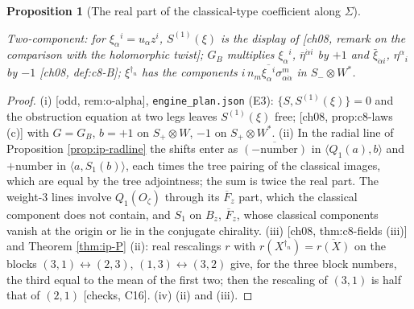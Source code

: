\documentclass[11pt]{report}
\theoremstyle{plain}
\newtheorem{proposition}[theorem]{Proposition}
\theoremstyle{definition}
\numberwithin{equation}{chapter}
\begin{document}
\begin{proposition}[The real part of the classical-type coefficient along $\Sigma$]
\begin{itemize}
\end{itemize}
Two-component: for $\xi_\alpha{}^i=u_\alpha z^i$, $S^{(1)}(\xi)$ is the display of [ch08, remark on the comparison with the holomorphic twist]; $G_B$ multiplies $\xi_\alpha{}^i$, $\bar\eta^{\dot\alpha i}$ by $+1$ and $\bar\xi_{\dot\alpha i}$, $\eta^\alpha{}_i$ by $-1$ [ch08, def:c8-B]; $\xi^{\dagger_n}$ has the components $i\,n_m\overline{\xi_\alpha{}^i}\sigma^m_{\alpha\dot\alpha}$ in $S_-\otimes W^*$.
\end{proposition}

\begin{proof}
(i) [odd, rem:o-alpha], \texttt{engine\_plan.json} (E3): $\{S,S^{(1)}(\xi)\}=0$ and the obstruction equation at two legs leaves $S^{(1)}(\xi)$ free; [ch08, prop:c8-laws (c)] with $G=G_B$, $b=+1$ on $S_+\otimes W$, $-1$ on $S_+\otimes W^*$. (ii) In the radial line of Proposition \ref{prop:ip-radline} the shifts enter as $\overline{(-\text{number})}$ in $\langle Q_1(a),b\rangle$ and $+\text{number}$ in $\langle a,S_1(b)\rangle$, each times the tree pairing of the classical images, which are equal by the tree adjointness; the sum is twice the real part. The weight-$3$ lines involve $Q_1(O_\zeta)$ through its $\overline F_z$ part, which the classical component does not contain, and $S_1$ on $B_z$, $\overline F_z$, whose classical components vanish at the origin or lie in the conjugate chirality. (iii) [ch08, thm:c8-fields (iii)] and Theorem \ref{thm:ip-P} (ii): real rescalings $r$ with $r(X^{\dagger_n})=\overline{r(X)}$ on the blocks $(3,1)\leftrightarrow(2,3)$, $(1,3)\leftrightarrow(3,2)$ give, for the three block numbers, the third equal to the mean of the first two; then the rescaling of $(3,1)$ is half that of $(2,1)$ [checks, C16]. (iv) (ii) and (iii).
\end{proof}
\end{document}
